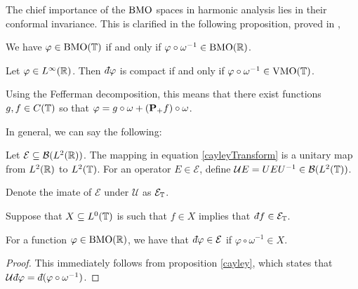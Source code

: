 The chief importance of the $\operatorname{BMO}$ spaces in harmonic analysis
lies in their conformal invariance. This is clarified in the following proposition,
proved in \cite[Cor 1.3, p.129]{Garnett},
\begin{proposition}
    We have $\varphi \in \operatorname{BMO}(\mathbb{T})$ if and only if $\varphi \circ \omega^{-1} \in \operatorname{BMO}(\mathbb{R})$.
\end{proposition}

\begin{proposition}
    Let $\varphi \in L^\infty(\mathbb{R})$. Then $\qd \varphi$ is compact
    if and only if $\varphi \circ \omega^{-1} \in \operatorname{VMO}(\mathbb{T})$.
    
    Using the Fefferman decomposition, this means that 
    there exist functions $g,f \in C(\mathbb{T})$ so that
    $\varphi = g\circ\omega + (\mathbf{P}_+f)\circ \omega$. 
\end{proposition}


In general, we can say the following:
\begin{proposition}
    Let $\mathcal{E} \subseteq \mathcal{B}(L^2(\mathbb{R}))$. 
    The mapping in equation \ref{cayleyTransform} is a unitary
    map from $L^2(\mathbb{R})$ to $L^2(\mathbb{T})$. For an operator
    $E \in \mathcal{E}$, define $\mathcal{U}E = UEU^{-1} \in \mathcal{B}(L^2(\mathbb{T}))$.
    
    Denote the imate of $\mathcal{E}$ under $\mathcal{U}$ as $\mathcal{E}_{\mathbb{T}}$.
    
    Suppose that $X \subseteq L^0(\mathbb{T})$ is such that $f \in X$
    implies that $\qd f \in \mathcal{E}_\Circ$.
    
    For a function
    $\varphi \in \operatorname{BMO}(\mathbb{R})$, we have that $\qd \varphi \in \mathcal{E}$
    if $\varphi\circ \omega^{-1} \in X$.
\end{proposition}
\begin{proof}
    This immediately follows from proposition \ref{cayley}, which states
    that $\mathcal{U}\qd \varphi = \qd (\varphi \circ \omega^{-1})$.
\end{proof}



